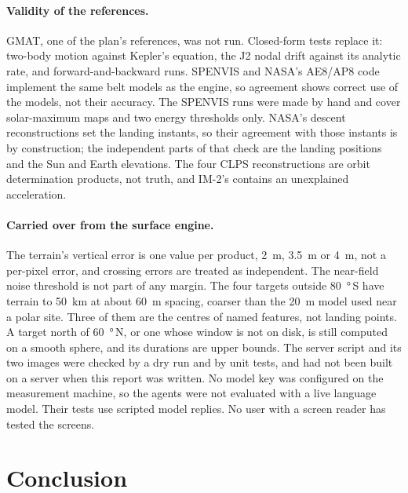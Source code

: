 \documentclass[11pt,a4paper]{article}
\begin{document}
\paragraph{Validity of the references.} GMAT, one of the plan's references, was
not run. Closed-form tests replace it: two-body motion against Kepler's equation, the
J2 nodal drift against its analytic rate, and forward-and-backward runs. SPENVIS and NASA's
AE8/AP8 code implement the same belt models as the engine, so agreement shows correct use
of the models, not their accuracy. The SPENVIS runs were made by hand and cover solar-maximum
maps and two energy thresholds only. NASA's descent reconstructions set the landing instants,
so their agreement with those instants is by construction; the independent parts of that check
are the landing positions and the Sun and Earth elevations. The four CLPS reconstructions are orbit
determination products, not truth, and IM-2's contains an unexplained acceleration.

\paragraph{Carried over from the surface engine.} The terrain's vertical error is one
value per product, \qty{2}{\m}, \qty{3.5}{\m} or \qty{4}{\m}, not a per-pixel error, and crossing errors
are treated as independent. The near-field noise threshold is not part of any margin.
The four targets outside \qty{80}{\degree}\,S have terrain to \qty{50}{\km} at about
\qty{60}{\m} spacing, coarser than the \qty{20}{\m} model used near a polar site. Three of them
are the centres of named features, not landing points. A target north of \qty{60}{\degree}\,N,
or one whose window is not on disk, is still computed on a smooth sphere, and its durations are
upper bounds. The server script and its two images were checked by a dry run and by unit
tests, and had not been built on a server when this report was written. No model key was configured on the
measurement machine, so the agents were not evaluated with a live language model. Their
tests use scripted model replies. No user with a screen reader has
tested the screens.

\section{Conclusion}
\label{sec:conclusion}
\end{document}
